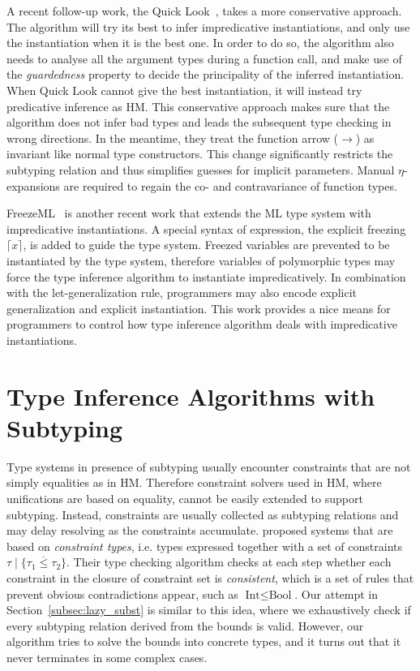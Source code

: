 A recent follow-up work, the Quick Look~\citep{quicklook2020},
takes a more conservative approach.
The algorithm will try its best to infer impredicative instantiations,
and only use the instantiation when it is the best one.
In order to do so,
the algorithm also needs to analyse all the argument types during a function call,
and make use of the \emph{guardedness} property to decide the principality of
the inferred instantiation.
When Quick Look cannot give the best instantiation,
it will instead try predicative inference as HM.
This conservative approach makes sure that the algorithm does not infer bad types
and leads the subsequent type checking in wrong directions.
In the meantime, they treat the function arrow ($\to$)
as invariant like normal type constructors.
This change significantly restricts the subtyping relation and thus
simplifies guesses for implicit parameters.
Manual $\eta$-expansions are required to regain
the co- and contravariance of function types.

FreezeML~\citep{FreezeML} is another recent work that extends the ML type system
with impredicative instantiations.
A special syntax of expression, the explicit freezing $\lceil x \rceil$,
is added to guide the type system.
Freezed variables are prevented to be instantiated by the type system,
therefore variables of polymorphic types may force the type inference algorithm
to instantiate impredicatively.
In combination with the let-generalization rule, programmers may also encode
explicit generalization and explicit instantiation.
This work provides a nice means for programmers to control how type inference algorithm
deals with impredicative instantiations.

\section{Type Inference Algorithms with Subtyping}
Type systems in presence of subtyping usually encounter constraints that
are not simply equalities as in HM.
Therefore constraint solvers used in HM, where unifications are based on equality,
cannot be easily extended to support subtyping.
Instead, constraints are usually collected as subtyping relations
and may delay resolving as the constraints accumulate.
\citet{EIFRIG1995,Eifrig1995sound} proposed systems that are based on
\emph{constraint types}, i.e. types expressed together with a set of constraints
$\tau \mid \{\overline{\tau_1 \le \tau_2}\}$.
Their type checking algorithm checks at each step whether
each constraint in the closure of constraint set is \emph{consistent},
which is a set of rules that prevent obvious contradictions appear,
such as $\text{Int} \le \text{Bool}$.
Our attempt in Section~\ref{subsec:lazy_subst} is similar to this idea,
where we exhaustively check if every subtyping relation derived from the bounds is valid.
However, our algorithm tries to solve the bounds into concrete types,
and it turns out that it never terminates in some complex cases.

